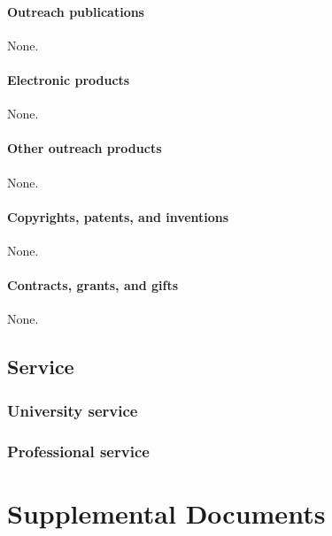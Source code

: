 \paragraph{Outreach publications}
None.

\paragraph{Electronic products}
None.

\paragraph{Other outreach products}
None.

\paragraph{Copyrights, patents, and inventions}
None.

\paragraph{Contracts, grants, and gifts}
None.

\subsection{Service}

\subsubsection{University service}


\subsubsection{Professional service}


\newpage

\section{Supplemental Documents}






